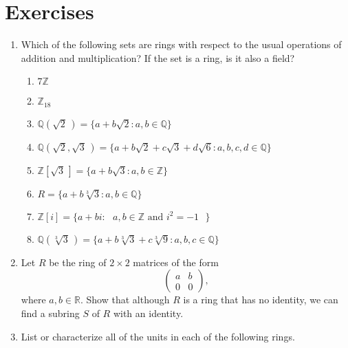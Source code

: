  
 
\section*{Exercises}
\exrule
 
 
{\small
\begin{enumerate}
 
 
\item
Which of the following sets are rings with respect to the usual
operations of addition and multiplication?  If the set is a ring, is
it also a field?
\begin{enumerate}
 
 \item
$7 {\mathbb Z}$
 
 \item
${\mathbb Z}_{18}$
 
 \item
${\mathbb Q} ( \sqrt{2}\, ) = \{a + b \sqrt{2} : a, b \in {\mathbb Q}\}$
 
 \item
${\mathbb Q} ( \sqrt{2}, \sqrt{3}\, ) = \{a + b \sqrt{2} + c \sqrt{3} + d
\sqrt{6} :  a, b, c, d \in {\mathbb Q}\}$
 
 \item
${\mathbb Z}[\sqrt{3}\, ] = \{ a + b \sqrt{3} : a, b \in {\mathbb Z} \}$
 
 \item
$R = \{a + b \sqrt[3]{3} : a, b \in {\mathbb Q} \}$
 
 \item
${\mathbb Z}[ i ] = \{ a + b i :\mbox{ $a, b \in {\mathbb Z}$ and  $i^2 =
-1$ } \}$ 
 
 \item
${\mathbb Q}( \sqrt[3]{3}\, ) = \{ a + b \sqrt[3]{3} + c \sqrt[3]{9} : a, b,
c \in {\mathbb Q} \}$ 
 
\end{enumerate}
 
 
\item
Let $R$ be the ring of $2 \times 2$ matrices of the form
\[
\begin{pmatrix}
a & b \\
0 & 0
\end{pmatrix},
\]
where $a, b \in {\mathbb R}$.  Show that although $R$ is a ring that has no
identity, we can find a subring $S$ of $R$ with an identity.
 
 
\item
List or characterize all of the units in each of the following rings.
\begin{enumerate}
 

\end{enumerate}
\end{enumerate}}
